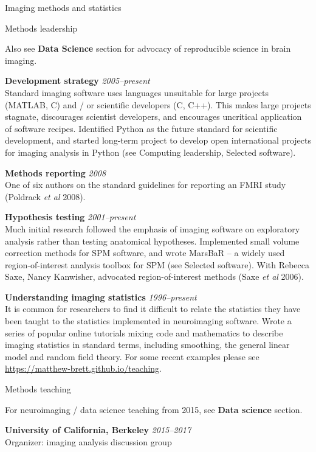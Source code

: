 \documentclass{cv}
\newcommand{\PlaceDateNote}[3]{{\bf #1} \hfill {\em #2} \\#3}
\newcommand{\UCB}{University of California, Berkeley}
\begin{document}
\begin{cvSection}{Imaging methods and statistics}

\begin{cvSubSection}{Methods leadership}

Also see {\bf Data Science} section for advocacy of reproducible science in
    brain imaging.

\PlaceDateNote{Development strategy}{2005--present}
{Standard imaging software uses languages unsuitable for large projects
    (MATLAB, C) and / or scientific developers (C, C++).  This makes large
    projects stagnate, discourages scientist developers, and encourages
    uncritical application of software recipes.  Identified Python as the
future standard for scientific development, and started long-term project to
develop open international projects for imaging analysis in Python (see
Computing leadership, Selected software).  }

\PlaceDateNote{Methods reporting}{2008}
{One of six authors on the standard guidelines for reporting an FMRI study
(Poldrack {\em et al} 2008).}

\PlaceDateNote{Hypothesis testing}{2001--present}
{Much initial research followed the emphasis of imaging software on
    exploratory analysis rather than testing anatomical hypotheses.
    Implemented small volume correction methods for SPM software, and wrote
    MarsBaR -- a widely used region-of-interest analysis toolbox for SPM (see
Selected software).  With Rebecca Saxe, Nancy Kanwisher, advocated
region-of-interest methods (Saxe {\em et al} 2006).}

\PlaceDateNote{Understanding imaging statistics}{1996--present} {It is common
    for researchers to find it difficult to relate the statistics they have
    been taught to the statistics implemented in neuroimaging software.  Wrote
    a series of popular online tutorials mixing code and mathematics to
    describe imaging statistics in standard terms, including smoothing, the
    general linear model and random field theory. For some recent examples
    please see \url{https://matthew-brett.github.io/teaching}.}

\end{cvSubSection}

\begin{cvSubSection}{Methods teaching}

    For neuroimaging / data science teaching from 2015, see {\bf Data science}
    section.

\PlaceDateNote{\UCB}{2015--2017}
{Organizer: imaging analysis discussion group}


\end{cvSubSection}
\end{cvSection}
\end{document}
